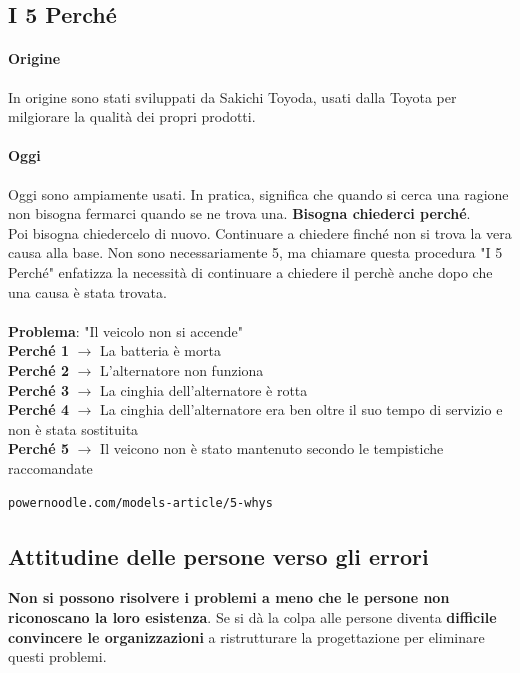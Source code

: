 \documentclass[10pt]{article}
\begin{document}
\subsection{I 5 Perché}
\begin{multicols}{2}
\paragraph{Origine} In origine sono stati sviluppati da Sakichi Toyoda, usati dalla Toyota per milgiorare la qualità dei propri prodotti.
\paragraph{Oggi} Oggi sono ampiamente usati. In pratica, significa che quando si cerca una ragione non bisogna fermarci quando se ne trova una. \textbf{Bisogna chiederci perché}.\\
Poi bisogna chiedercelo di nuovo. Continuare a chiedere finché non si trova la vera causa alla base. Non sono necessariamente 5, ma chiamare questa procedura "I 5 Perché" enfatizza la necessità di continuare a chiedere il perchè anche dopo che una causa è stata trovata.\\\\

\columnbreak
\textbf{Problema}: "Il veicolo non si accende"\\
\textbf{Perché 1} $\longrightarrow$ La batteria è morta\\
\textbf{Perché 2} $\longrightarrow$ L'alternatore non funziona\\
\textbf{Perché 3} $\longrightarrow$ La cinghia dell'alternatore è rotta\\
\textbf{Perché 4} $\longrightarrow$ La cinghia dell'alternatore era ben oltre il suo tempo di servizio e non è stata sostituita\\
\textbf{Perché 5} $\longrightarrow$ Il veicono non è stato mantenuto secondo le tempistiche raccomandate\\
\end{multicols}
\texttt{powernoodle.com/models-article/5-whys}
\subsection{Attitudine delle persone verso gli errori}
\textbf{Non si possono risolvere i problemi a meno che le persone non riconoscano la loro esistenza}. Se si dà la colpa alle persone diventa \textbf{difficile convincere le organizzazioni} a ristrutturare la progettazione per eliminare questi problemi.
\end{document}
